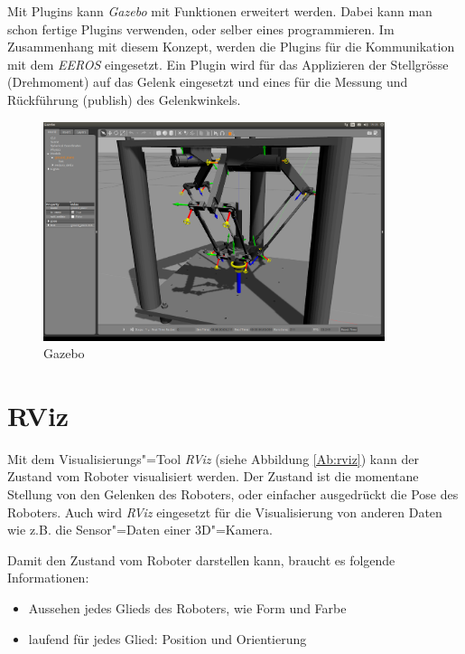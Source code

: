 Mit Plugins kann \textit{Gazebo} mit Funktionen erweitert werden.
Dabei kann man schon fertige Plugins verwenden, oder selber eines programmieren.
Im Zusammenhang mit diesem Konzept, werden die Plugins für die Kommunikation mit dem \textit{EEROS} eingesetzt.
Ein Plugin wird für das Applizieren der Stellgrösse (Drehmoment) auf das Gelenk eingesetzt und eines für die Messung und Rückführung (publish) des Gelenkwinkels.
\begin{figure}[ht!]
	\centering
	\includegraphics[width=10cm]{images/gazebo.png}
	\caption{Gazebo}
	\label{Ab:gazebo}
\end{figure}


\section{RViz}
\label{chap:rviz}
Mit dem Visualisierungs"=Tool \textit{RViz} (siehe Abbildung \ref{Ab:rviz}) kann der Zustand vom Roboter visualisiert werden.
Der Zustand ist die momentane Stellung von den Gelenken des Roboters, oder einfacher ausgedrückt die Pose des Roboters.
Auch wird \textit{RViz} eingesetzt für die Visualisierung von anderen Daten wie z.B. die Sensor"=Daten einer 3D"=Kamera.

Damit  den Zustand vom Roboter darstellen kann, braucht es folgende Informationen:
\begin{itemize}
\item Aussehen jedes Glieds des Roboters, wie Form und Farbe 
\item laufend für jedes Glied: Position und Orientierung
\end{itemize}

